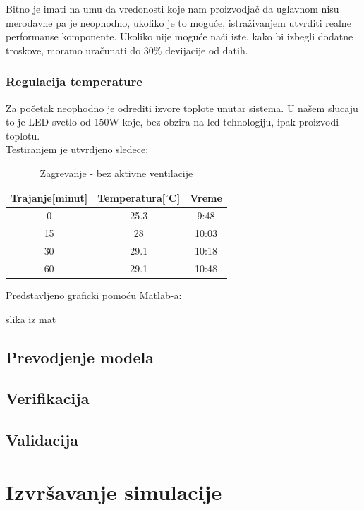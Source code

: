 \documentclass[a4paper,11pt]{book}
\begin{document}
\noindent Bitno je imati na umu da vredonosti koje nam proizvodjač da uglavnom nisu merodavne pa je neophodno, ukoliko je to moguće, istraživanjem utvrditi realne performanse komponente. Ukoliko nije moguće naći iste, kako bi izbegli dodatne troskove, moramo uračunati do 30\% devijacije od datih.

\subsection{Regulacija temperature}

Za početak neophodno je odrediti izvore toplote unutar sistema. U našem slucaju to je LED svetlo od 150W koje, bez obzira na led tehnologiju, ipak proizvodi toplotu.\\

Testiranjem je utvrdjeno sledece:

\begin{table}[ht]
  \caption{Zagrevanje - bez aktivne ventilacije}
  \centering
  \begin{tabular}{|c|c|c|}
  \hline
    Trajanje[minut] & Temperatura[$^\circ$C] & Vreme\\ \hline
  0 & 25.3 & 9:48 \\ \hline
  15 & 28 & 10:03 \\ \hline
  30 & 29.1 & 10:18 \\ \hline
  60 & 29.1 & 10:48 \\ \hline
  \end{tabular}
\end{table}

Predstavljeno graficki pomoću Matlab-a:

slika iz mat







\section{Prevodjenje modela}

\section{Verifikacija}

\section{Validacija}

\chapter{Izvršavanje simulacije}
\end{document}
